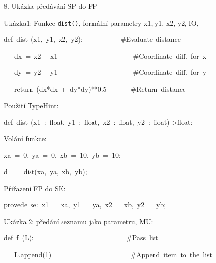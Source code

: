 \documentclass[czech]{beamer}
\newenvironment{lyxcode}
  {\par\begin{list}{}{
    \setlength{\rightmargin}{\leftmargin}
    \setlength{\listparindent}{0pt}%
    \raggedright
    \setlength{\itemsep}{0pt}
    \setlength{\parsep}{0pt}
    \normalfont\ttfamily}%
   \def\{{\char`\{}
   \def\}{\char`\}}
   \def\textasciitilde{\char`\~}
   \item[]}
  {\end{list}}
\begin{document}
\begin{frame}[plain]{8. Ukázka předávání SP do FP}

{\scriptsize Ukázka1: Funkce }{\scriptsize\texttt{dist()}}{\scriptsize ,
formální parametry x1, y1, x2, y2, IO,}{\scriptsize\par}
\begin{lyxcode}
{\scriptsize def~dist~(x1,~y1,~x2,~y2):~~~~~~~~~~~\#Evaluate~distance}~

{\scriptsize\par}{\scriptsize ~~~dx~=~x2~-~x1~~~~~~~~~~~~~~~~~~~~~~\#Coordinate~diff.~for~x}{\scriptsize\par}

{\scriptsize ~~~dy~=~y2~-~y1~~~~~~~~~~~~~~~~~~~~~~\#Coordinate~diff.~for~y}{\scriptsize\par}

{\scriptsize ~~~return~(dx{*}dx~+~dy{*}dy){*}{*}0.5~~~~~~~\#Return~distance}{\scriptsize\par}
\end{lyxcode}
{\scriptsize Použití TypeHint:}{\scriptsize\par}
\begin{lyxcode}
{\scriptsize def~dist~(x1~:~float,~y1~:~float,~x2~:~float,~y2~:~float)->float:~}{\scriptsize\par}
\end{lyxcode}
{\scriptsize Volání funkce:}{\scriptsize\par}
\begin{lyxcode}
{\scriptsize xa~=~0,~ya~=~0,~xb~=~10,~yb~=~10;}{\scriptsize\par}

{\scriptsize d~~=~dist(xa,~ya,~xb,~yb);}{\scriptsize\par}
\end{lyxcode}
{\scriptsize Přiřazení FP do SK:}{\scriptsize\par}
\begin{lyxcode}
{\scriptsize provede~se:~x1~=~xa,~y1~=~ya,~x2~=~xb,~y2~=~yb;~~}{\scriptsize\par}
\end{lyxcode}
{\scriptsize Ukázka 2: předání seznamu jako parametru, MU:}{\scriptsize\par}
\begin{lyxcode}
{\scriptsize def~f~(L):~~~~~~~~~~~~~~~~~~~~~~~~~~~\#Pass~list}~

{\scriptsize\par}{\scriptsize ~~~L.append(1)~~~~~~~~~~~~~~~~~~~~~~~\#Append~item~to~the~list}{\scriptsize\par}


\end{lyxcode}
\end{frame}
\end{document}
